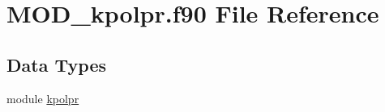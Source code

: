 \hypertarget{MOD__kpolpr_8f90}{\section{M\-O\-D\-\_\-kpolpr.\-f90 File Reference}
\label{MOD__kpolpr_8f90}
}
\subsection*{Data Types}
\begin{DoxyCompactItemize}
\item 
module \hyperlink{classkpolpr}{kpolpr}
\end{DoxyCompactItemize}
